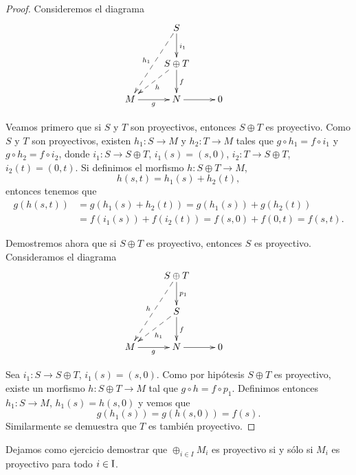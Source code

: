 \begin{proof}
Consideremos el diagrama
	\[
	\xymatrix{ & S\ar[d]^{i_1}\ar@{-->}[ddl]_{h_1} \\
	& S\oplus T\ar[d]^f\ar@{-->}[dl]^{h}\\ M\ar[r]_g & N\ar[r] & 0 }
	\quad
	\]

Veamos primero que si $S$ y $T$ son proyectivos, entonces $S\oplus T$ es proyectivo. Como $S$ y $T$ 
son proyectivos, existen $h_1\colon S\to M$ y $h_2\colon T\to M$ tales que
$g\circ h_1=f\circ i_1$ y $g\circ h_2=f\circ i_2$, donde
$i_1\colon S\to S\oplus T$, $i_1(s)=(s,0)$, $i_2\colon T\to S\oplus T$, $i_2(t)=(0,t)$.  
Si definimos el morfismo 
$h\colon S\oplus T\to M$,
\[
h(s,t)=h_1(s)+h_2(t),
\] 	
entonces tenemos que 
\begin{align*}
g(h(s,t))&=g(h_1(s)+h_2(t))=g(h_1(s))+g(h_2(t))\\
&=f(i_1(s))+f(i_2(t))=f(s,0)+f(0,t)=f(s,t).
\end{align*}
	
Demostremos ahora que si $S\oplus T$ es proyectivo, entonces $S$ es proyectivo. 
Consideramos el diagrama
	\[
	\xymatrix{ & S\oplus T\ar[d]^{p_1}\ar@{-->}[ddl]_{h} \\
	& S\ar[d]^f\ar@{-->}[dl]^{h_1}\\ M\ar[r]_g & N\ar[r] & 0 }
	\quad
	\]

Sea $i_1\colon S\to S\oplus T$, $i_1(s)=(s,0)$.  
Como por hipótesis $S\oplus T$ es proyectivo, existe un morfismo 
$h\colon S\oplus T\to M$ tal que $g\circ h=f\circ p_1$. 
Definimos entonces $h_1\colon S\to M$, $h_1(s)=h(s,0)$ 
y vemos que
\[
g(h_1(s))=g(h(s,0))=f(s).
\]
Similarmente se demuestra que $T$ es también proyectivo.
\end{proof}

Dejamos como ejercicio demostrar 
que $\oplus_{i\in I}M_i$ es proyectivo si y sólo si $M_i$ es proyectivo para todo $i\in\operatorname{I}$. 	

